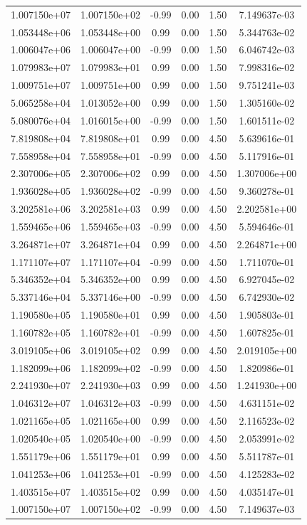 \documentclass{article}
\begin{document}
\begin{table}[htbp]
\begin{tabular}{cccccc}
1.007150e+07 & 1.007150e+02 & -0.99 & 0.00 & 1.50 & 7.149637e-03 \\
1.053448e+06 & 1.053448e+00 & 0.99 & 0.00 & 1.50 & 5.344763e-02 \\
1.006047e+06 & 1.006047e+00 & -0.99 & 0.00 & 1.50 & 6.046742e-03 \\
1.079983e+07 & 1.079983e+01 & 0.99 & 0.00 & 1.50 & 7.998316e-02 \\
1.009751e+07 & 1.009751e+00 & 0.99 & 0.00 & 1.50 & 9.751241e-03 \\
5.065258e+04 & 1.013052e+00 & 0.99 & 0.00 & 1.50 & 1.305160e-02 \\
5.080076e+04 & 1.016015e+00 & -0.99 & 0.00 & 1.50 & 1.601511e-02 \\
7.819808e+04 & 7.819808e+01 & 0.99 & 0.00 & 4.50 & 5.639616e-01 \\
7.558958e+04 & 7.558958e+01 & -0.99 & 0.00 & 4.50 & 5.117916e-01 \\
2.307006e+05 & 2.307006e+02 & 0.99 & 0.00 & 4.50 & 1.307006e+00 \\
1.936028e+05 & 1.936028e+02 & -0.99 & 0.00 & 4.50 & 9.360278e-01 \\
3.202581e+06 & 3.202581e+03 & 0.99 & 0.00 & 4.50 & 2.202581e+00 \\
1.559465e+06 & 1.559465e+03 & -0.99 & 0.00 & 4.50 & 5.594646e-01 \\
3.264871e+07 & 3.264871e+04 & 0.99 & 0.00 & 4.50 & 2.264871e+00 \\
1.171107e+07 & 1.171107e+04 & -0.99 & 0.00 & 4.50 & 1.711070e-01 \\
5.346352e+04 & 5.346352e+00 & 0.99 & 0.00 & 4.50 & 6.927045e-02 \\
5.337146e+04 & 5.337146e+00 & -0.99 & 0.00 & 4.50 & 6.742930e-02 \\
1.190580e+05 & 1.190580e+01 & 0.99 & 0.00 & 4.50 & 1.905803e-01 \\
1.160782e+05 & 1.160782e+01 & -0.99 & 0.00 & 4.50 & 1.607825e-01 \\
3.019105e+06 & 3.019105e+02 & 0.99 & 0.00 & 4.50 & 2.019105e+00 \\
1.182099e+06 & 1.182099e+02 & -0.99 & 0.00 & 4.50 & 1.820986e-01 \\
2.241930e+07 & 2.241930e+03 & 0.99 & 0.00 & 4.50 & 1.241930e+00 \\
1.046312e+07 & 1.046312e+03 & -0.99 & 0.00 & 4.50 & 4.631151e-02 \\
1.021165e+05 & 1.021165e+00 & 0.99 & 0.00 & 4.50 & 2.116523e-02 \\
1.020540e+05 & 1.020540e+00 & -0.99 & 0.00 & 4.50 & 2.053991e-02 \\
1.551179e+06 & 1.551179e+01 & 0.99 & 0.00 & 4.50 & 5.511787e-01 \\
1.041253e+06 & 1.041253e+01 & -0.99 & 0.00 & 4.50 & 4.125283e-02 \\
1.403515e+07 & 1.403515e+02 & 0.99 & 0.00 & 4.50 & 4.035147e-01 \\
1.007150e+07 & 1.007150e+02 & -0.99 & 0.00 & 4.50 & 7.149637e-03 \\
\hline
\end{tabular}
\end{table}
\end{document}
